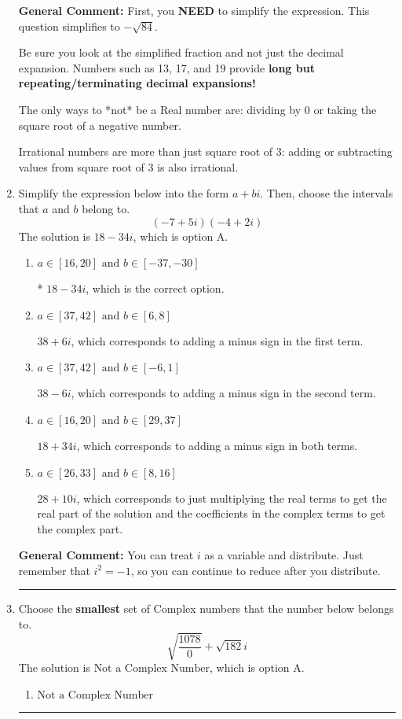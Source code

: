 \documentclass{extbook}[14pt]
\newcommand{\litem}[1]{\item #1

\rule{\textwidth}{0.4pt}}
\begin{document}
\begin{enumerate}
{\textbf{General Comment:} First, you \textbf{NEED} to simplify the expression. This question simplifies to $-\sqrt{84}$. 
 
 Be sure you look at the simplified fraction and not just the decimal expansion. Numbers such as 13, 17, and 19 provide \textbf{long but repeating/terminating decimal expansions!} 
 
 The only ways to *not* be a Real number are: dividing by 0 or taking the square root of a negative number. 
 
 Irrational numbers are more than just square root of 3: adding or subtracting values from square root of 3 is also irrational.
}
\litem{
Simplify the expression below into the form $a+bi$. Then, choose the intervals that $a$ and $b$ belong to.
\[ (-7 + 5 i)(-4 + 2 i) \]The solution is \( 18 - 34 i \), which is option A.\begin{enumerate}[label=\Alph*.]
\item \( a \in [16, 20] \text{ and } b \in [-37, -30] \)

* $18 - 34 i$, which is the correct option.
\item \( a \in [37, 42] \text{ and } b \in [6, 8] \)

 $38 + 6 i$, which corresponds to adding a minus sign in the first term.
\item \( a \in [37, 42] \text{ and } b \in [-6, 1] \)

 $38 - 6 i$, which corresponds to adding a minus sign in the second term.
\item \( a \in [16, 20] \text{ and } b \in [29, 37] \)

 $18 + 34 i$, which corresponds to adding a minus sign in both terms.
\item \( a \in [26, 33] \text{ and } b \in [8, 16] \)

 $28 + 10 i$, which corresponds to just multiplying the real terms to get the real part of the solution and the coefficients in the complex terms to get the complex part.
\end{enumerate}

\textbf{General Comment:} You can treat $i$ as a variable and distribute. Just remember that $i^2=-1$, so you can continue to reduce after you distribute.
}
\litem{
Choose the \textbf{smallest} set of Complex numbers that the number below belongs to.
\[ \sqrt{\frac{1078}{0}}+\sqrt{182} i \]The solution is \( \text{Not a Complex Number} \), which is option A.\begin{enumerate}[label=\Alph*.]
\item \( \text{Not a Complex Number} \)


\end{enumerate}}
\end{enumerate}
\end{document}
